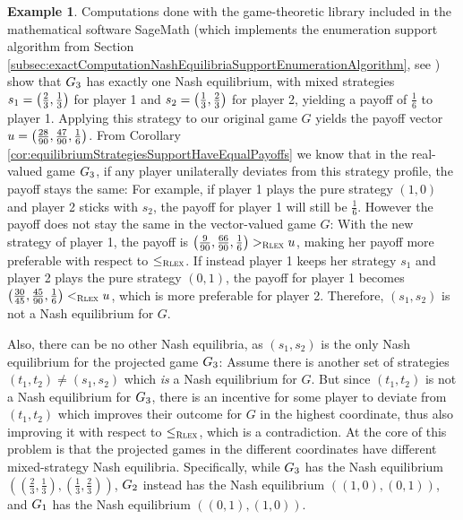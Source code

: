 \documentclass[a4paper,DIV=11,abstracton,twoside=semi]{scrreprt}
\theoremstyle{definition}
\newtheorem{ex}[thm]{Example} %
\begin{document}
\begin{ex}
        Computations done with the game-theoretic library included in the mathematical software {SageMath} (which implements the enumeration support algorithm from Section \ref{subsec:exactComputationNashEquilibriaSupportEnumerationAlgorithm}, see \cite{bib:sageNormalFormGameDocumentation})
        show that $G_{3}$ has exactly one Nash equilibrium, with mixed strategies $s_1 = \bigl(\frac{2}{3}, \frac{1}{3}\bigr)$ for player 1 and $s_2 = \bigl(\frac{1}{3}, \frac{2}{3}\bigr)$ for player 2, yielding a payoff of $\frac{1}{6}$ to player 1.
        Applying this strategy to our original game $G$ yields the payoff vector $u = \bigl(\frac{28}{90}, \frac{47}{90}, \frac{1}{6}\bigr)$.
        From Corollary \ref{cor:equilibriumStrategiesSupportHaveEqualPayoffs} we know that in the real-valued game $G_{3}$, if any player unilaterally deviates from this strategy profile, the payoff stays the same: 
        For example, if player 1 plays the pure strategy $(1, 0)$ and player 2 sticks with $s_2$, the payoff for player 1 will still be $\frac{1}{6}$.
        However the payoff does not stay the same in the vector-valued game $G$:
        With the new strategy of player 1, the payoff is $\bigl(\frac{9}{90}, \frac{66}{90}, \frac{1}{6}\bigr) >_{\textsc{Rlex}} u$, making her payoff more preferable with respect to $\leq_{\textsc{Rlex}}$.
        If instead player 1 keeps her strategy $s_1$ and player 2 plays the pure strategy $(0, 1)$, the payoff for player 1 becomes $\bigl(\frac{30}{45}, \frac{45}{90}, \frac{1}{6}\bigr) <_{\textsc{Rlex}} u$, which is more preferable for player 2.
        Therefore, $(s_1, s_2)$ is not a Nash equilibrium for $G$.
            
        Also, there can be no other Nash equilibria, as $(s_1, s_2)$ is the only Nash equilibrium for the projected game $G_{3}$: Assume there is another set of strategies $(t_1, t_2) \neq (s_1, s_2)$ which \emph{is} a Nash equilibrium for $G$. But since $(t_1, t_2)$ is not a Nash equilibrium for $G_{3}$, there is an incentive for some player to deviate from $(t_1, t_2)$ which improves their outcome for $G$ in the highest coordinate, thus also improving it with respect to $\leq_{\textsc{Rlex}}$, which is a contradiction.        
        At the core of this problem is that the projected games in the different coordinates have different mixed-strategy Nash equilibria.
        Specifically, while $G_{3}$ has the Nash equilibrium $((\frac{2}{3}, \frac{1}{3}), (\frac{1}{3}, \frac{2}{3}))$,
        $G_{2}$ instead has the Nash equilibrium $((1, 0), (0, 1))$, and $G_{1}$ has the Nash equilibrium $((0, 1), (1, 0))$.
    \end{ex}
\end{document}
